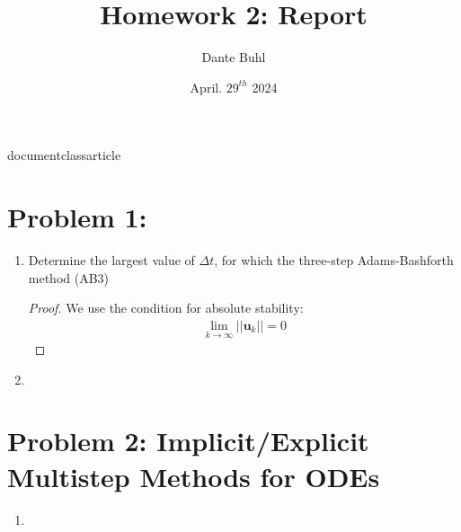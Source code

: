 documentclass{article}
\usepackage{graphicx} %
\usepackage[margin=1in]{geometry}
\usepackage{amsmath}
\usepackage{amsthm}
\usepackage{amssymb}
\usepackage{amsfonts}
\usepackage{enumitem}
\usepackage{verbatim}
\usepackage{xcolor}

\title{Homework 2: Report}
\author{Dante Buhl}
\date{April. $29^{th}$ 2024}


\DeclareMathOperator{\cond}{cond}
\DeclareMathOperator{\vecspan}{span}



\newcommand{\bs}[1]{\boldsymbol{#1}}
\newcommand{\bmp}[1]{\begin{minipage}{#1\textwidth}}
\newcommand{\emp}{\end{minipage}}
\newcommand{\R}{\mathbb{R}}
\newcommand{\C}{\mathbb{C}}
\newcommand{\N}{\mathcal{N}}
\newcommand{\I}{\mathrm{I}}
\newcommand{\K}{\bs{\mathrm{K}}}
\newcommand{\m}{\bs{\mu}_*}
\newcommand{\s}{\bs{\Sigma}_*}
\newcommand{\dt}{\Delta t}
\newcommand{\tr}[1]{\text{Tr}(#1)}
\newcommand{\Tr}[1]{\text{Tr}(#1)}
      
\maketitle

\section*{Problem 1: }
\begin{enumerate}[label=\alph*)]

  \item Determine the largest value of $\Delta t$, for which the three-step Adams-Bashforth method (AB3)
    \begin{proof}
      We use the condition for absolute stability: 
      \begin{align}
        \lim_{k \to \infty} ||\bs{u}_k|| = 0
      \end{align}
    \end{proof}
  \item 

\end{enumerate}


\section*{Problem 2: Implicit/Explicit Multistep Methods for ODEs}

\begin{enumerate}[label=\alph*)]

  \item       

\end{enumerate}


